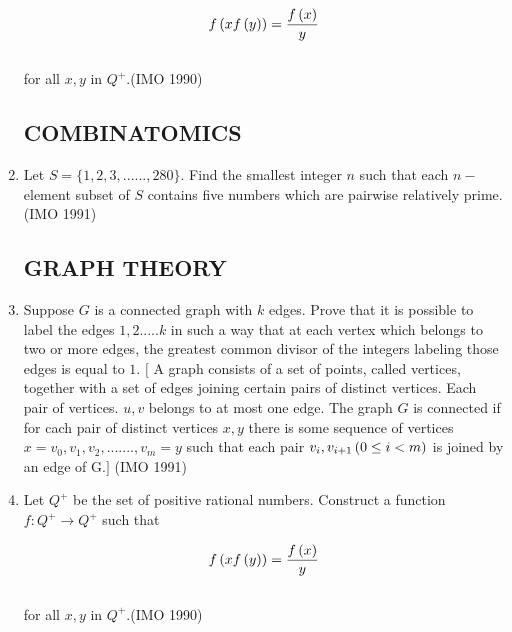 \begin{enumerate}
			\begin{align*}  f\left(xf\left(y\right)\right)= \frac{f\left(x\right)}{y} \end{align*}\\ for all $x , y$ in $Q^+$.\hfill(IMO 1990)


      \subsection*{COMBINATOMICS}

  \item Let $S = \{1,2,3,......,280\}$. Find the smallest integer $n$ such that each $n-$ element subset of $S$ contains five numbers which are pairwise relatively prime.\hfill(IMO 1991)

	  \subsection*{GRAPH THEORY}

  \item Suppose $G$ is a connected graph with $k$ edges. Prove that it is possible to label the edges $1,2.....k$ in such a way that at each vertex which belongs to two or more edges, the greatest common divisor of the integers labeling those edges is equal to $1$.
	  $[$ A graph consists of a set of points, called vertices, together with a set of edges joining certain pairs of distinct vertices. Each pair of vertices. $u, v$ belongs to at most one edge. The graph $G$ is connected if for cach pair of distinct vertices $x, y$ there is some sequence of vertices   $x=v_0,v_1,v_2,.......,v_m = y$  such that each pair $v_i,v_{i+1}\left(0\leq i < m\right)$ is joined by an edge of G$.]$ \hfill(IMO 1991)
	  \item Let $Q^+$ be the set of positive rational numbers. Construct a function $ f: Q^+ \rightarrow Q^+$ such that 

			\begin{align*}  f\left(xf\left(y\right)\right)= \frac{f\left(x\right)}{y} \end{align*}\\ for all $x , y$ in $Q^+$.\hfill(IMO 1990)
\end{enumerate}
